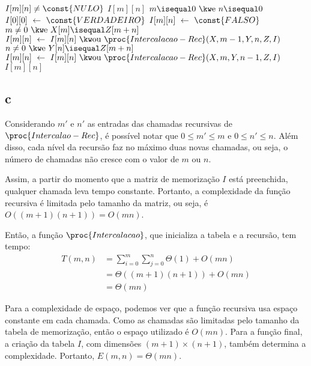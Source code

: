 \begin{codebox}
    \li {} $I[m][n] \ne \const{NULO}$
        \Then
    \li     {} $I[m][n]$
        \End
    \li
    \li {} $m \isequal 0 \And n \isequal 0$
        \Then
    \li     $I[0][0] \gets \const{VERDADEIRO}$
        \End
    \li {}
        \Then
    \li     $I[m][n] \gets \const{FALSO}$
    \li     {} $m \ne 0 \And X[m] \isequal Z[m + n]$
            \Then
    \li         $I[m][n] \gets I[m][n] \Or \proc{Intercalacao-Rec}(X, m - 1, Y, n, Z, I)$
            \End
    \li     {} $n \ne 0 \And Y[n] \isequal Z[m + n]$
            \Then
    \li         $I[m][n] \gets I[m][n] \Or \proc{Intercalacao-Rec}(X, m, Y, n-1, Z, I)$
            \End
        \End
    \li
    \li {} $I[m][n]$
\end{codebox}

\newpage

\subsection{c}

Considerando $m'$ e $n'$ as entradas das chamadas recursivas de $\proc{Intercalao-Rec}$, é possível notar que $0 \leq m' \leq m$ e $0 \leq n' \leq n$. Além disso, cada nível da recursão faz no máximo duas novas chamadas, ou seja, o número de chamadas não cresce com o valor de $m$ ou $n$.

Assim, a partir do momento que a matriz de memorização $I$ está preenchida, qualquer chamada leva tempo constante. Portanto, a complexidade da função recursiva é limitada pelo tamanho da matriz, ou seja, é $O\left((m + 1) (n + 1)\right) = O(m n)$.

Então, a função $\proc{Intercalacao}$, que inicializa a tabela e a recursão, tem tempo:
\begin{align*}
    T(m, n) &= \sum_{i = 0}^m \sum_{j = 0}^n \Theta(1) + O(m n) \\
        &= \Theta((m + 1) (n + 1)) + O(m n) \\
        &= \Theta(m n)
\end{align*}

Para a complexidade de espaço, podemos ver que a função recursiva usa espaço constante em cada chamada. Como as chamadas são limitadas pelo tamanho da tabela de memorização, então o espaço utilizado é $O(m n)$. Para a função final, a criação da tabela $I$, com dimensões $(m + 1) \times (n + 1)$, também determina a complexidade. Portanto, $E(m, n) = \Theta(m n)$.
